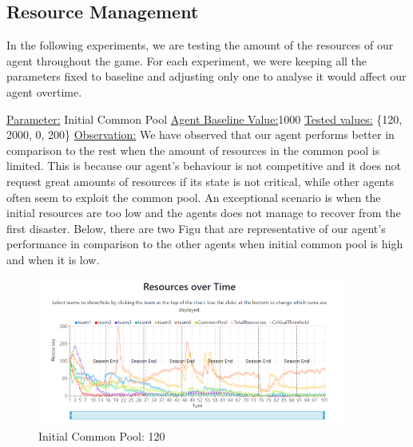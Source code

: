 \newpage
\subsection{Resource Management}

In the following experiments, we are testing the amount of the resources of our agent throughout the game. For each experiment, we were keeping all the parameters fixed to baseline and adjusting only one to analyse it would affect our agent overtime. 

\underline{Parameter:} Initial Common Pool \newline
\underline{Agent Baseline Value:}1000 \newline
\underline{Tested values:} \{120, 2000, 0, 200\} \newline
\underline{Observation:} \newline
We have observed that our agent performs better in comparison to the rest when the amount of resources in the common pool is limited. This is because our agent's behaviour is not competitive and it does not request great amounts of resources if its state is not critical, while other agents often seem to exploit the common pool. An exceptional scenario is when the initial resources are too low and the agents does not manage to recover from the first disaster.
Below, there are two Figu that are representative of our agent's performance in comparison to the other agents when initial common pool is high and when it is low.

\begin{figure}[!htb]
    \centering
    \includegraphics[width=0.9\textwidth]{13_team5_agentdesign/images/InitCP120.PNG}
    \caption{Initial Common Pool: 120}
    \label{eq:Initial Common Pool: 120}
\end{figure}

